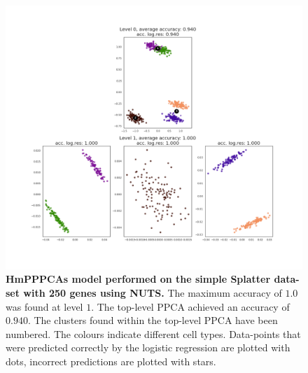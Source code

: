 \begin{figure}
    \centering
    \includegraphics[width=\linewidth]{figs/simple_250_nuts.png}
    \caption[HmPPPCAs model performed on the simple Splatter data-set with 250 genes using NUTS]{\small \textbf{HmPPPCAs model performed on the simple Splatter data-set with 250 genes using NUTS.} \small The maximum accuracy of $1.0$ was found at level $1$. The top-level PPCA achieved an accuracy of $0.940$. The clusters found within the top-level PPCA have been numbered. The colours indicate different cell types. Data-points that were predicted correctly by the logistic regression are plotted with dots, incorrect predictions are plotted with stars.}
    \label{fig:simple_250_nuts}
\end{figure}



